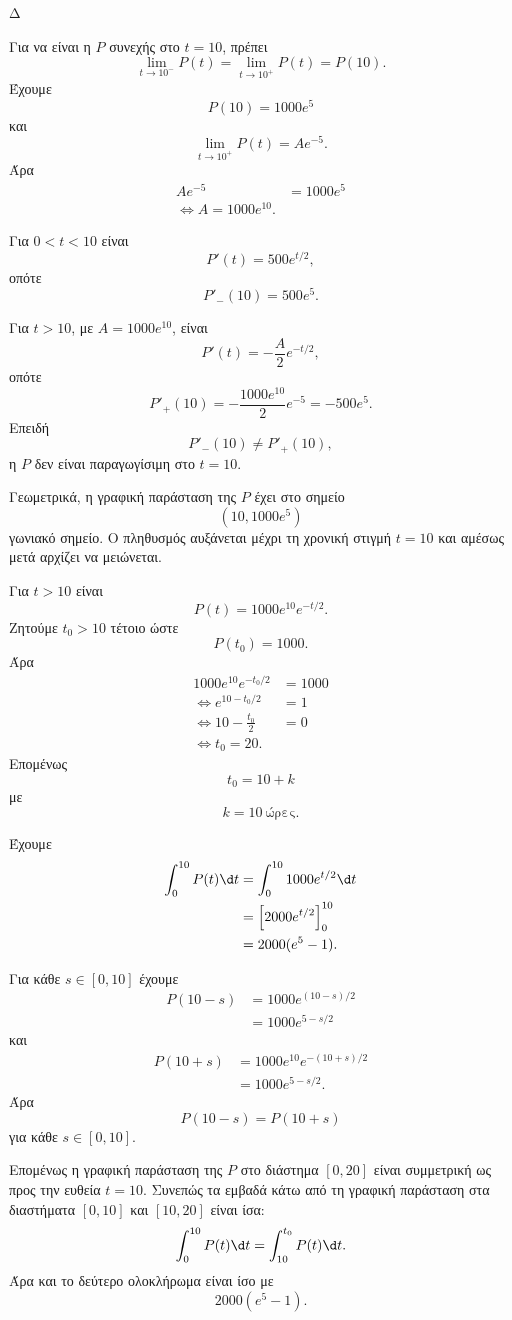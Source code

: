 \begin{thema}{Δ}
\begin{erwthma}
\item Για να είναι η $P$ συνεχής στο $t=10$, πρέπει
\[
\lim_{t\to10^-}P(t)
=\lim_{t\to10^+}P(t)
=P(10).
\]
Έχουμε
\[
P(10)=1000e^5
\]
και
\[
\lim_{t\to10^+}P(t)=Ae^{-5}.
\]
Άρα
\begin{align*}
Ae^{-5}&=1000e^5\\
\Leftrightarrow
{A=1000e^{10}}.
\end{align*}

\item Για $0<t<10$ είναι
\[
P'(t)=500e^{t/2},
\]
οπότε
\[
P'_-(10)=500e^5.
\]

Για $t>10$, με $A=1000e^{10}$, είναι
\[
P'(t)=-\frac{A}{2}e^{-t/2},
\]
οπότε
\[
P'_+(10)
=-\frac{1000e^{10}}{2}e^{-5}
=-500e^5.
\]
Επειδή
\[
P'_-(10)\neq P'_+(10),
\]
η $P$ δεν είναι παραγωγίσιμη στο $t=10$.

Γεωμετρικά, η γραφική παράσταση της $P$ έχει στο σημείο
\[
\left(10,1000e^5\right)
\]
γωνιακό σημείο. Ο πληθυσμός αυξάνεται μέχρι τη χρονική στιγμή $t=10$ και αμέσως μετά αρχίζει να μειώνεται.

\item Για $t>10$ είναι
\[
P(t)=1000e^{10}e^{-t/2}.
\]
Ζητούμε $t_0>10$ τέτοιο ώστε
\[
P(t_0)=1000.
\]
Άρα
\begin{align*}
1000e^{10}e^{-t_0/2}&=1000\\
\Leftrightarrow
e^{10-t_0/2}&=1\\
\Leftrightarrow
10-\frac{t_0}{2}&=0\\
\Leftrightarrow
{t_0=20}.
\end{align*}
Επομένως
\[
t_0=10+k
\]
με
\[
{k=10\ \text{ώρες}}.
\]

\item Έχουμε
\begin{align*}
\int_0^{10}P(t)\d t
&=\int_0^{10}1000e^{t/2}\d t\\
&=\left[2000e^{t/2}\right]_0^{10}\\
&={2000(e^5-1)}.
\end{align*}

Για κάθε $s\in[0,10]$ έχουμε
\begin{align*}
P(10-s)
&=1000e^{(10-s)/2}\\
&=1000e^{5-s/2}
\end{align*}
και
\begin{align*}
P(10+s)
&=1000e^{10}e^{-(10+s)/2}\\
&=1000e^{5-s/2}.
\end{align*}
Άρα
\[
{P(10-s)=P(10+s)}
\]
για κάθε $s\in[0,10]$.

Επομένως η γραφική παράσταση της $P$ στο διάστημα $[0,20]$ είναι συμμετρική ως προς την ευθεία $t=10$. Συνεπώς τα εμβαδά κάτω από τη γραφική παράσταση στα διαστήματα $[0,10]$ και $[10,20]$ είναι ίσα:
\[
{
\int_0^{10}P(t)\d t
=\int_{10}^{t_0}P(t)\d t}.
\]
Άρα και το δεύτερο ολοκλήρωμα είναι ίσο με
\[
2000(e^5-1).
\]
\end{erwthma}
\end{thema}

